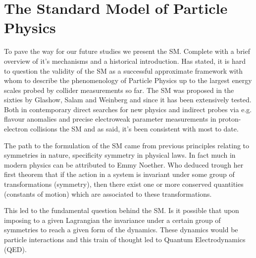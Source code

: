 \newpage 

\section{The Standard Model of Particle Physics}

To pave the way for our future studies we present the SM. Complete with a brief overview of it's mechanisms and a historical introduction.
%
Has stated, it is hard to question the validity of the SM as a successful approximate framework with whom to describe the phenomenology of Particle Physics up to the largest energy scales probed by collider measurements so far. 
%
The SM was proposed in the sixties by Glashow, Salam and Weinberg and since it has been extensively tested. Both in contemporary direct searches for new physics and indirect probes via e.g. flavour anomalies and precise electroweak parameter measurements in proton-electron collisions the SM and as said, it's been consistent with most to date.


%

The path to the formulation of the SM came from previous principles relating to symmetries in nature, specificity symmetry in physical laws. In fact much in modern physics can be attributed to Emmy Noether. Who deduced trough her first theorem that if the action in a system is invariant under some group of transformations (symmetry), then there exist one or more conserved quantities (constants of motion) which are associated to these transformations. 

This led to the fundamental question behind the SM. Is it possible that upon imposing to a given Lagrangian the invariance under a certain group of symmetries to reach a given form of the dynamics. These dynamics would be particle interactions and this train of thought led to Quantum Electrodynamics (QED).

